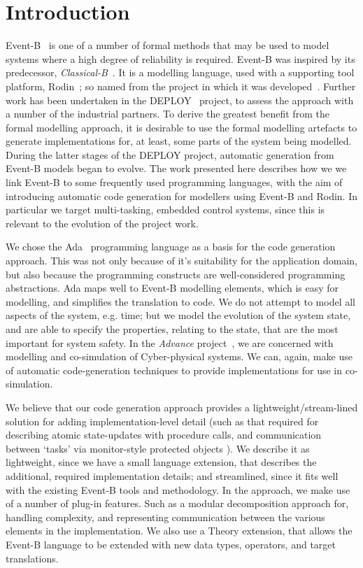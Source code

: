 \section{Introduction}\label{intro}
Event-B~\cite{ABR10} is one of a number of formal methods that may be used to model systems where a high degree of reliability is required. Event-B was inspired by its predecessor, \emph{Classical-B}~\cite{TheBBook}. It is a modelling language, used with a supporting tool platform, Rodin~\cite{abrial10rodin}; so named from the project in which it was developed~\cite{RodinTool}. Further work has been undertaken in the DEPLOY~\cite{DEPLOY} project, to assess the approach with a number of the industrial partners. To derive the greatest benefit from the formal modelling approach, it is desirable to use the formal modelling artefacts to generate implementations for, at least, some parts of the system being modelled. During the latter stages of the DEPLOY project, automatic generation from Event-B models began to evolve. The work presented here describes how we we link Event-B to some frequently used programming languages, with the aim of introducing automatic code generation for modellers using Event-B and Rodin. In particular we target multi-tasking, embedded control systems, since this is relevant to the evolution of the project work. 

We chose the Ada~\cite{ada2005} programming language as a basis for the code generation approach. This was not only because of it's suitability for the application domain, but also because the programming constructs are well-considered programming abstractions. Ada maps well to Event-B modelling elements, which is easy for modelling, and simplifies the translation to code. We do not attempt to model all aspects of the system, e.g. time; but we model the evolution of the system state, and are able to specify the properties, relating to the state, that are the most important for system safety. In the \emph{Advance} project~\cite{advance}, we are concerned with modelling and co-simulation of Cyber-physical systems. We can, again, make use of automatic code-generation techniques to provide implementations for use in co-simulation.    

We believe that our code generation approach provides a lightweight/stream-lined solution for adding implementation-level detail (such as that required for describing atomic state-updates with procedure calls, and communication between `tasks' via monitor-style protected objects ). We describe it as lightweight, since we have a small language extension, that describes the additional, required implementation details; and streamlined, since it fits well with the existing Event-B tools and methodology. In the approach, we make use of a number of plug-in features. Such as a modular decomposition approach for, handling complexity, and representing communication between the  various elements in the implementation. We also use a Theory extension, that allows the Event-B language to be extended with new data types, operators, and target translations.

